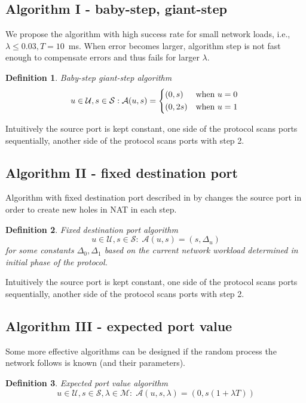\documentclass[twoside]{article}
\newtheorem{mydef}{Definition}
\begin{document}
\begin{multicols}{2}
\subsection{Algorithm I - baby-step, giant-step}
We propose the algorithm with high success rate for small network loads, i.e.,
$\lambda \leq 0.03, T=10$~ms. When error becomes larger,
algorithm step is not fast enough to compensate errors and thus fails for larger $\lambda$.

\begin{mydef}
Baby-step giant-step algorithm
\[
u \in \mathcal{U}, s \in \mathcal{S}: 
\mathcal{A}(u, s) = \begin{dcases*}
         (0, s)  & when $u=0$\\
         (0, 2s) & when $u=1$
        \end{dcases*}
\]
\end{mydef}

Intuitively the source port is kept constant, one side of the protocol scans ports sequentially, another
side of the protocol scans ports with step 2.

\subsection{Algorithm II - fixed destination port}
Algorithm with fixed destination port described in by \citep{Wang:2006:RSN:1156422.1156550}
changes the source port in order to create new holes in NAT in each step.

\begin{mydef}
Fixed destination port algorithm
\[
u \in \mathcal{U}, s \in \mathcal{S}: \;
\mathcal{A}(u, s) = (s, \Delta_u)
\] for some constants $\Delta_0, \Delta_1$ based on the current network workload determined in initial phase
of the protocol.
\end{mydef}

Intuitively the source port is kept constant, one side of the protocol scans ports sequentially, another
side of the protocol scans ports with step 2.

\subsection{Algorithm III - expected port value}
Some more effective algorithms can be designed if the random process the network follows is known (and their
parameters).

\begin{mydef}
Expected port value algorithm
\[
u \in \mathcal{U}, s \in \mathcal{S}, \lambda \in \mathcal{M}:\;
\mathcal{A}(u, s, \lambda) = (0, s(1 + \lambda T))
\]
\end{mydef}





\end{multicols}
\end{document}
